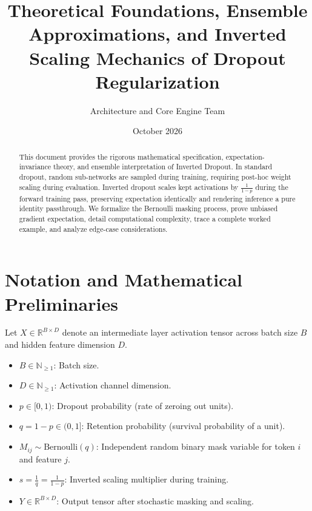 \documentclass[11pt,a4paper]{article}
\title{\textbf{Theoretical Foundations, Ensemble Approximations, and Inverted Scaling Mechanics of Dropout Regularization}}
\author{Architecture and Core Engine Team}
\date{October 2026}
\theoremstyle{definition}
\begin{document}
\maketitle

\begin{abstract}
This document provides the rigorous mathematical specification, expectation-invariance theory, and ensemble interpretation of Inverted Dropout. In standard dropout, random sub-networks are sampled during training, requiring post-hoc weight scaling during evaluation. Inverted dropout scales kept activations by $\frac{1}{1-p}$ during the forward training pass, preserving expectation identically and rendering inference a pure identity passthrough. We formalize the Bernoulli masking process, prove unbiased gradient expectation, detail computational complexity, trace a complete worked example, and analyze edge-case considerations.
\end{abstract}

\section{Notation and Mathematical Preliminaries}

Let $X \in \mathbb{R}^{B \times D}$ denote an intermediate layer activation tensor across batch size $B$ and hidden feature dimension $D$.

\begin{itemize}
    \item $B \in \mathbb{N}_{\ge 1}$: Batch size.
    \item $D \in \mathbb{N}_{\ge 1}$: Activation channel dimension.
    \item $p \in [0, 1)$: Dropout probability (rate of zeroing out units).
    \item $q = 1 - p \in (0, 1]$: Retention probability (survival probability of a unit).
    \item $M_{ij} \sim \text{Bernoulli}(q)$: Independent random binary mask variable for token $i$ and feature $j$.
    \item $s = \frac{1}{q} = \frac{1}{1-p}$: Inverted scaling multiplier during training.
    \item $Y \in \mathbb{R}^{B \times D}$: Output tensor after stochastic masking and scaling.
\end{itemize}
\end{document}
